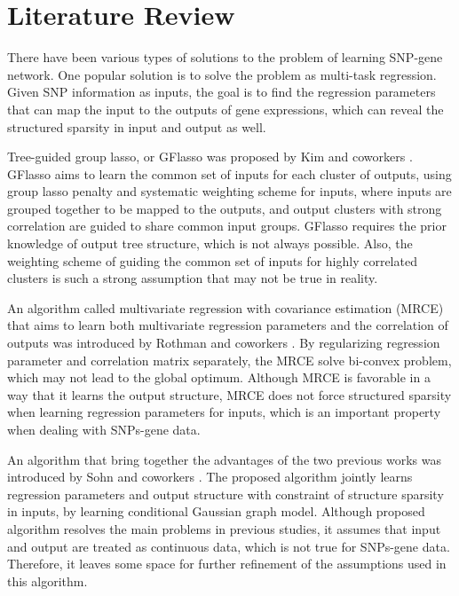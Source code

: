 \documentclass{article}
\begin{document}
\section{Literature Review}

There have been various types of solutions to the problem of learning SNP-gene network. One popular solution is to solve the problem as multi-task regression.
Given SNP information as inputs, the goal is to find the regression parameters that can map the input to the outputs of gene expressions, which can reveal the structured sparsity in input and output as well.




Tree-guided group lasso, or GFlasso was proposed by Kim and coworkers \cite{kim2010tree}.
GFlasso aims to learn the common set of inputs for each cluster of outputs, using group lasso penalty and systematic weighting scheme for inputs, where inputs are grouped together to be mapped to the outputs, and output clusters with strong correlation are guided to share common input groups.
GFlasso requires the prior knowledge of output tree structure, which is not always possible.
Also, the weighting scheme of guiding the common set of inputs for highly correlated clusters is such a strong assumption that may not be true in reality.


An algorithm called multivariate regression with covariance estimation (MRCE) that aims to learn both multivariate regression parameters and the correlation of outputs was introduced by Rothman and coworkers \cite{rothman2010sparse}.
By regularizing regression parameter and correlation matrix separately, the MRCE solve bi-convex problem, which may not lead to the global optimum. Although MRCE is favorable in a way that it learns the output structure, MRCE does not force structured sparsity when learning regression parameters for inputs, which is an important property when dealing with SNPs-gene data.


An algorithm that bring together the advantages of the two previous works \cite{kim2010tree} \cite{rothman2010sparse} was introduced by Sohn and coworkers \cite{sohn2012joint}. 
The proposed algorithm jointly learns regression parameters and output structure with constraint of structure sparsity in inputs, by learning conditional Gaussian graph model.
Although proposed algorithm resolves the main problems in previous studies, it assumes that input and output are treated as continuous data, which is not true for SNPs-gene data.
Therefore, it leaves some space for further refinement of the assumptions used in this algorithm.
\end{document}
